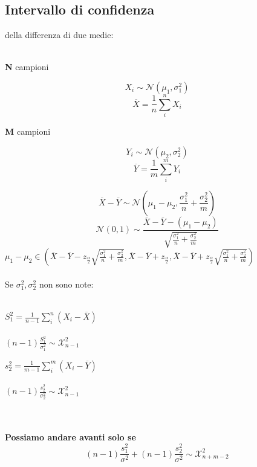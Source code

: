\documentclass[]{article}
\begin{document}
    \subsection{Intervallo di confidenza}della differenza di due medie: \\ \\
    \begin{minipage}{0.5\textwidth}
        \centerline{\textbf{N} campioni}
        \[ X_i \sim \mathcal{N}(\mu_1, \sigma_1^2) \]
        \[ \overline{X} = \frac{1}{n} \sum_{i}^{n} X_i \]
    \end{minipage}
    \begin{minipage}{0.5\textwidth}
        \centerline{\textbf{M} campioni}
        \[ Y_i \sim \mathcal{N}(\mu_2, \sigma_2^2) \]
        \[ \overline{Y} = \frac{1}{m} \sum_{i}^{m} Y_i \]
    \end{minipage}
    \[ \overline{X} - \overline{Y} \sim \mathcal{N}\left ( \mu_1 - \mu_2, \frac{\sigma_1^2}{n} + \frac{\sigma_2^2}{m} \right ) \]
    \[ \mathcal{N}(0,1) \sim \frac{\overline{X} - \overline{Y} - (\mu_1 - \mu_2)}{\sqrt{\frac{\sigma_1^2}{n} + \frac{\sigma_2^2}{m}}} \]
    $\mu_1 - \mu_2 \in \left ( \overline{X} - \overline{Y} - z_{\frac{\alpha}{2}} \sqrt{\frac{\sigma_1^2}{n} + \frac{\sigma_2^2}{m}}, \overline{X} - \overline{Y} + z_{\frac{\alpha}{2}}, \overline{X} - \overline{Y} + z_{\frac{\alpha}{2}} \sqrt{\frac{\sigma_1^2}{n} + \frac{\sigma_2^2}{m}} \right )$ \\ \\
    Se $\sigma_1^2, \sigma_2^2$ non sono note: \\ \\
    \begin{minipage}{0.5\textwidth}
        $S_1^2 = \frac{1}{n-1} \sum_{i}^{n}(X_i - \overline{X})$ \\ \\
        $(n-1) \frac{S_1^2}{\sigma_1^2} \sim \mathcal{X}_{n-1}^2$
    \end{minipage}
    \begin{minipage}{0.5\textwidth}
        $s_2^2 = \frac{1}{m - 1} \sum_{i}^{m} (X_i - \overline{Y})$ \\ \\
        $(n-1) \frac{s_2^2}{\sigma_2^2} \sim \mathcal{X}_{n-1}^2$
    \end{minipage} \\ \\
    \textbf{Possiamo andare avanti solo se }
    \[ (n-1) \frac{s_1^2}{\sigma^2} + (n-1) \frac{s_2^2}{\sigma^2} \sim \mathcal{X}_{n+m-2}^2 \]
\end{document}
